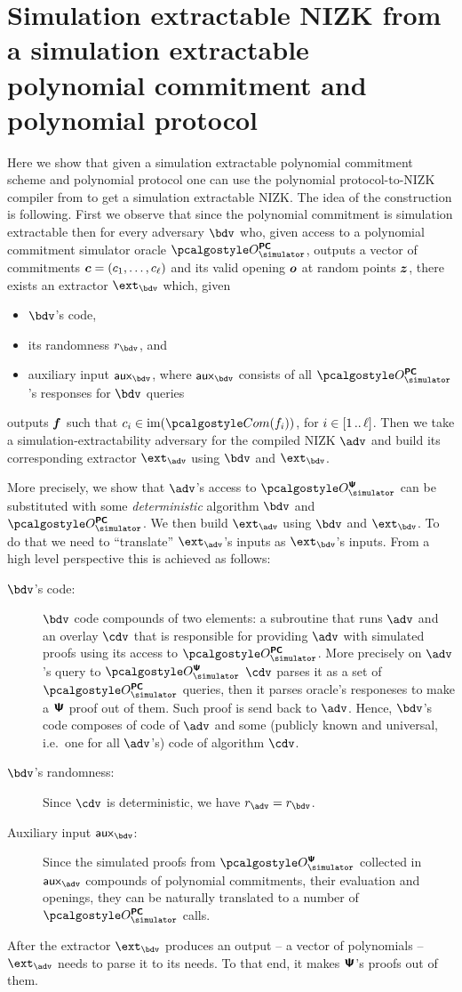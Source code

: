 \documentclass[runningheads,11pt]{llncs}
\let\spvec\vec
\let\vec\accentvec
\let\spvec\vec
\let\vec\spvec
\def\vec#1{\mathchoice{\mbox{\boldmath$\displaystyle#1$}}
  {\mbox{\boldmath$\textstyle#1$}} {\mbox{\boldmath$\scriptstyle#1$}}
  {\mbox{\boldmath$\scriptscriptstyle#1$}}}
\begin{document}
\section{Simulation extractable NIZK from a simulation extractable polynomial
  commitment and polynomial protocol}
Here we show that given a simulation extractable polynomial commitment scheme
and polynomial protocol one can use the polynomial protocol-to-NIZK compiler
from \cite{EPRINT:GabWilCio19} to get a simulation extractable NIZK. The idea of
the construction is following. First we observe that since the polynomial
commitment is simulation extractable then for every adversary $\bdv$ who, given
access to a polynomial commitment simulator oracle $\oraclespcom$, outputs a
vector of commitments $\vec{c} = (c_1, \ldots, c_\ell)$ and its valid opening $\vec{o}$ at random points
$\vec{z}$, there exists an
extractor $\ext_\bdv$ which, given
\begin{itemize}
\item $\bdv$'s code,
\item its randomness $r_\bdv$, and
\item auxiliary input $\aux_\bdv$, where $\aux_\bdv$ consists of all
  $\oraclespcom$'s responses for $\bdv$ queries
\end{itemize}
outputs $\vec{f}$ such that $c_i \in \image(\com(f_i))$, for
$i \in [1 \, .. \, \ell]$.  Then we take a simulation-extractability adversary for
the compiled NIZK $\adv$ and build its corresponding extractor $\ext_\adv$ using
$\bdv$ and $\ext_\bdv$.

More precisely, we show that $\adv$'s access to $\oraclesps$ can be substituted
with some \emph{deterministic} algorithm $\bdv$ and $\oraclespcom$. We then
build $\ext_\adv$ using $\bdv$ and $\ext_\bdv$. To do that we need
to ``translate'' $\ext_\adv$'s inputs as $\ext_\bdv$'s inputs. From a high level
perspective this is achieved as follows:
\begin{description}
\item[$\bdv$'s code:] $\bdv$ code compounds of two elements: a subroutine that
  runs $\adv$ and an overlay $\cdv$ that is responsible for providing $\adv$ with
  simulated proofs using its access to $\oraclespcom$. More precisely on
  $\adv$'s query to $\oraclesps$ $\cdv$ parses it as a set of $\oraclespcom$
  queries, then it parses oracle's responeses to make a $\bm{\mathsf{\Psi}}$ proof out of
  them. Such proof is send back to $\adv$. Hence, $\bdv$'s code composes of code
  of $\adv$ and some (publicly known and universal, i.e.~one for all $\adv$'s)
  code of algorithm $\cdv$. 
\item[$\bdv$'s randomness:] Since $\cdv$ is deterministic, we have
  $r_\adv = r_\bdv$.
\item[Auxiliary input $\aux_\bdv$:] Since the simulated proofs from $\oraclesps$
  collected in $\aux_\adv$ compounds of polynomial commitments, their evaluation
  and openings, they can be naturally translated to a number of $\oraclespcom$
  calls.
\end{description}
After the extractor $\ext_\bdv$ produces an output -- a vector of polynomials --
$\ext_\adv$ needs to parse it to its needs. To that end, it makes $\bm{\mathsf{\Psi}}$'s proofs
out of them.
\end{document}
